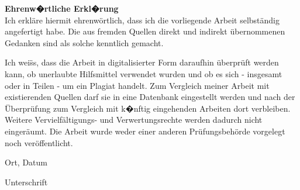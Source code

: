 \cleardoublepage
{}
\thispagestyle{empty}
\textbf{Ehrenw�rtliche Erkl�rung}\\

Ich erkl{\"a}re hiermit ehrenw{\"o}rtlich, dass ich die vorliegende Arbeit selbst{\"a}ndig angefertigt habe. Die aus fremden Quellen direkt und indirekt {\"u}bernommenen Gedanken sind als solche kenntlich gemacht.

Ich wei{\"ss}, dass die Arbeit in digitalisierter Form daraufhin {\"u}berpr{\"u}ft werden kann, ob unerlaubte Hilfsmittel verwendet wurden und ob es sich - insgesamt oder in Teilen - um ein Plagiat handelt. Zum Vergleich meiner Arbeit mit existierenden Quellen darf sie in eine Datenbank eingestellt werden und nach der {\"U}berpr{\"u}fung zum Vergleich mit k�nftig eingehenden Arbeiten dort verbleiben. Weitere Verviel\-f{\"a}ltigungs- und Verwertungsrechte werden dadurch nicht einger{\"a}umt. Die Arbeit wurde weder einer anderen Pr{\"u}fungsbeh{\"o}rde vorgelegt noch ver{\"o}ffentlicht.


\vspace{2cm}
Ort, Datum
\vspace{2cm}

Unterschrift

